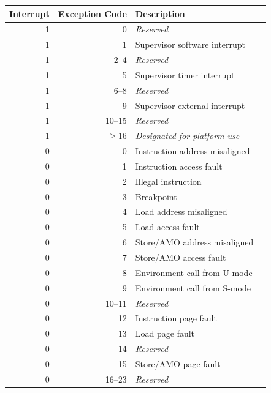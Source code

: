 \begin{table}[h!]
\begin{center}
\begin{tabular}{|r|r|l|l|}

  \hline
  Interrupt & Exception Code  & Description \\
  \hline
  1         & 0               & {\em Reserved} \\
  1         & 1               & Supervisor software interrupt \\
  1         & 2--4            & {\em Reserved} \\
  1         & 5               & Supervisor timer interrupt \\
  1         & 6--8            & {\em Reserved} \\
  1         & 9               & Supervisor external interrupt \\
  1         & 10--15          & {\em Reserved} \\
  1         & $\ge$16         & {\em Designated for platform use} \\ \hline
  0         & 0               & Instruction address misaligned \\
  0         & 1               & Instruction access fault \\
  0         & 2               & Illegal instruction \\
  0         & 3               & Breakpoint \\
  0         & 4               & Load address misaligned \\
  0         & 5               & Load access fault \\
  0         & 6               & Store/AMO address misaligned \\
  0         & 7               & Store/AMO access fault \\
  0         & 8               & Environment call from U-mode \\
  0         & 9               & Environment call from S-mode \\
  0         & 10--11          & {\em Reserved} \\
  0         & 12              & Instruction page fault \\
  0         & 13              & Load page fault \\
  0         & 14              & {\em Reserved} \\
  0         & 15              & Store/AMO page fault \\
  0         & 16--23          & {\em Reserved} \\

\end{tabular}
\end{center}
\end{table}
